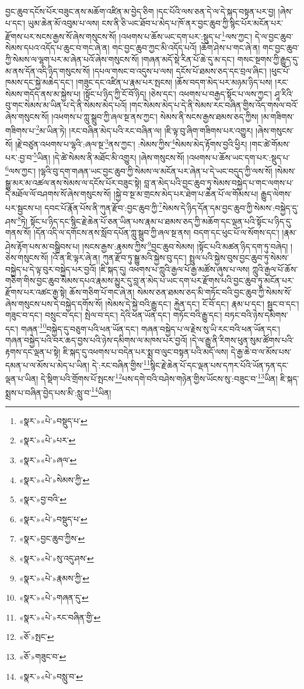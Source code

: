 བྱང་ཆུབ་དངོས་པོར་བཟུང་ནས་མཆོག་འཛིན་མ་བྱེད་ཅིག །དང་པོའི་ལས་ཅན་དེ་ལ་དེ་སྐད་བསྟན་པར་བྱ། །ཞེས་པ་དང་། ཡུམ་ཆེན་མོ་འབུམ་པ་ལས། ངས་ནི་ཅི་ཡང་ཐོབ་པ་མེད་པ་ཁོ་ནར་བྱང་ཆུབ་ཀྱི་སྙིང་པོར་མངོན་པར་རྫོགས་པར་སངས་རྒྱས་སོ་ཞེས་གསུངས་སོ། །འཕགས་པ་ཆོས་ཡང་དག་པར་:སྡུད་པ་\footnote{«སྣར་»«པེ་»བསྡུད་པ་}ལས་ཀྱང་། དེ་ལ་བྱང་ཆུབ་སེམས་དཔའ་འདོད་པ་ཆུང་བ་གང་ཞེ་ན། གང་བྱང་ཆུབ་ཀྱང་མི་འདོད་པའོ། །ཆོག་ཤེས་པ་གང་ཞེ་ན། གང་བྱང་ཆུབ་ཀྱི་སེམས་ལ་ལྷག་པར་མ་ཞེན་པའོ་ཞེས་གསུངས་སོ། །གཞན་མདོ་སྡེ་རིན་པོ་ཆེ་དུ་མ་དང་། གསང་སྔགས་ཀྱི་རྒྱུད་དུ་མ་ནས་དོན་འདི་ཉིད་གསུངས་སོ། །དཔལ་གསང་བ་འདུས་པ་ལས། དངོས་པོ་ཐམས་ཅད་དང་བྲལ་ཞིང་། །ཕུང་པོ་ཁམས་དང་སྐྱེ་མཆེད་དང་། །གཟུང་དང་འཛིན་པ་རྣམ་པར་སྤངས། །ཆོས་བདག་མེད་པར་མཉམ་ཉིད་པས། །རང་སེམས་གདོད་ནས་མ་སྐྱེས་པ། །སྟོང་པ་ཉིད་ཀྱི་ངོ་བོ་ཉིད། །ཅེས་དང་། འཕགས་པ་བརྒྱད་སྟོང་པ་ལས་ཀྱང་། ཤཱ་རིའི་བུ་གང་སེམས་མ་ཡིན་པ་དེ་ནི་སེམས་མེད་པའོ། །གང་སེམས་མེད་པ་དེ་ནི་སེམས་རང་བཞིན་གྱིས་འོད་གསལ་བའོ་ཞེས་གསུངས་སོ། །འཕགས་པ་ཀླུ་སྒྲུབ་ཀྱི་ཞལ་སྔ་ནས་ཀྱང་། སེམས་ནི་སངས་རྒྱས་ཐམས་ཅད་ཀྱིས། །མ་གཟིགས་གཟིགས་པ་\footnote{«སྣར་»«པེ་»པར་}མ་ཡིན་ཏེ། །རང་བཞིན་མེད་པའི་རང་བཞིན་ལ། །ཇི་ལྟ་བུ་ཞིག་གཟིགས་པར་འགྱུར། །ཞེས་གསུངས་སོ། །རྗེ་བཙུན་འཕགས་པ་ལྷའི་:ཞལ་སྔ་\footnote{«སྣར་»«པེ་»ཞལ་}ནས་ཀྱང་། :སེམས་ཀྱིས་\footnote{«སྣར་»«པེ་»སེམས་ཀྱི་}སེམས་མེད་རྟོགས་བྱའི་ཕྱིར། །གང་ཚེ་གོམས་པར་:བྱ་བ་\footnote{«སྣར་»བྱ་བའི་}ཡིན། །དེ་ཚེ་སེམས་ནི་མཐོང་མི་འགྱུར། །ཞེས་གསུངས་སོ། །འཕགས་པ་ཆོས་ཡང་དག་པར་:སྡུད་པ་\footnote{«སྣར་»«པེ་»བསྡུད་པ་}ལས་ཀྱང་། །ལྷའི་བུ་དག་གཞན་ཡང་བྱང་ཆུབ་ཀྱི་སེམས་ལ་མངོན་པར་ཞེན་པ་དེ་ཡང་བདུད་ཀྱི་ལས་སོ། །སེམས་སྒྱུ་མར་མ་འཚལ་ནས་སེམས་ལ་དངོས་པོར་བཟུང་སྟེ། བླ་ན་མེད་པའི་བྱང་ཆུབ་ཏུ་སེམས་བསྐྱེད་པ་གང་ལགས་པ་དེ་མཐོལ་ལོ་བཤགས་སོ་ཞེས་གསུངས་སོ། །སྐྱེ་བ་སྔ་མ་གྲངས་མེད་པར་ཐེག་པ་ཆེན་པོ་ལ་གོམས་པ། རྒྱུད་ལེགས་པར་སྦྱངས་པ། དབང་པོ་རྣོན་པོས་ནི་ཀུན་རྫོབ་:བྱང་ཆུབ་ཀྱི་\footnote{«སྣར་»བྱང་ཆུབ་ཀྱིས་}སེམས་དེ་ཉིད་དོན་དམ་བྱང་ཆུབ་ཀྱི་སེམས་:བསྐྱེད་དུ་ཤས་\footnote{«སྣར་»«པེ་»སུ་འདུ་ཤས་}ཏེ། སྟོང་པ་ཉིད་དང་སྙིང་རྗེ་ཆེན་པོ་ཅན་ཡིན་པས་རྣམ་པ་ཐམས་ཅད་ཀྱི་མཆོག་དང་ལྡན་པའི་སྟོང་པ་ཉིད་དུ་གནས་སོ། །དོན་འདི་ལ་དགོངས་ནས་སློབ་དཔོན་ཀླུ་སྒྲུབ་ཀྱི་ཞལ་སྔ་ནས། བདག་དང་ཕུང་པོ་ལ་སོགས་དང་། །རྣམ་ཤེས་རྟོག་པས་མ་བསྒྲིབས་པ། །སངས་རྒྱས་:རྣམས་ཀྱིས་\footnote{«སྣར་»«པེ་»རྣམས་ཀྱི་}བྱང་ཆུབ་སེམས། །སྟོང་པའི་མཚན་ཉིད་དག་ཏུ་བཞེད། །ཅེས་གསུངས་སོ། །འོ་ན་ཇི་ལྟར་ཞེ་ན། ཀུན་རྫོབ་ཏུ་སྒྱུ་མའི་སྐྱེས་བུ་དང་། སྤྲུལ་པའི་སྐྱེས་བུས་བྱང་ཆུབ་ཏུ་སེམས་བསྐྱེད་པ་དེ་ལྟ་བུར་བསྐྱེད་པར་བྱའོ། །ཇི་སྐད་དུ། འཕགས་པ་ཀླུའི་རྒྱལ་པོ་རྒྱ་མཚོས་ཞུས་པ་ལས། ཀླུའི་རྒྱལ་པོ་ཆོས་གཅིག་གིས་བྱང་ཆུབ་སེམས་དཔའ་རྣམས་མྱུར་དུ་བླ་ན་མེད་པ་ཡང་དག་པར་རྫོགས་པའི་བྱང་ཆུབ་ཏུ་མངོན་པར་རྫོགས་པར་འཚང་རྒྱ་སྟེ། ཆོས་གཅིག་པོ་གང་ཞེ་ན། སེམས་ཅན་ཐམས་ཅད་མི་གཏོང་བའི་བྱང་ཆུབ་ཀྱི་སེམས་སོ་ཞེས་གསུངས་པས་དེ་བསྐྱེད་དགོས་སོ། །སེམས་དེ་སྐྱེ་བའི་རྒྱུ་དང་། རྐྱེན་དང་། ངོ་བོ་དང་། རྣམ་པ་དང་། སྦྱང་བ་དང་། གཟུང་བ་དང་། བསྲུང་བ་དང་། སྤེལ་བ་དང་། དེའི་ཕན་ཡོན་དང་། གཏོང་བའི་རྒྱུ་དང་། བཏང་བའི་ཉེས་དམིགས་དང་། གཞན་\footnote{«སྣར་»«པེ་»གཞན་དུ་}བསྐྱེད་དུ་བཅུག་པའི་ཕན་ཡོན་དང་། གཞན་བསྐྱེད་པ་ལ་རྗེས་སུ་ཡི་རང་བའི་ཕན་ཡོན་དང་། གཞན་བསྐྱེད་པའི་བར་ཆད་བྱས་པའི་ཉེས་དམིགས་ལ་མཁས་པར་བྱའོ། །དེ་ལ་རྒྱུ་ནི་རིགས་ཕུན་སུམ་ཚོགས་པའི་རྟགས་དང་ལྡན་པ་སྟེ། ཇི་སྐད་དུ་འཕགས་པ་བདེན་པར་སྨྲ་བ་ལུང་བསྟན་པའི་མདོ་ལས། དེ་རྒྱ་ཆེ་བ་ལ་མོས་པས་དམན་པ་ལ་མོས་པ་མེད་པ་ཡིན། དེ་:རང་བཞིན་གྱིས་\footnote{«སྣར་»«པེ་»རང་བཞིན་གྱི་}སྙིང་རྗེ་ཆེན་པོ་དང་ལྡན་པས་དཀར་པོའི་ཡོན་ཏན་དང་ལྡན་པ་ཡིན། དེ་སྡིག་པའི་གྲོགས་པོ་སྤངས་\footnote{«ཅོ་»སྤང་}པས་དགེ་བའི་བཤེས་གཉེན་གྱིས་ཡོངས་སུ་:བཟུང་བ་\footnote{«ཅོ་»གཟུང་བ་}ཡིན། ཇི་སྐད་སྨྲས་པ་བཞིན་བྱེད་པས་མི་:སླུ་བ་\footnote{«སྣར་»«པེ་»བསླུ་བ་}ཡིན། 